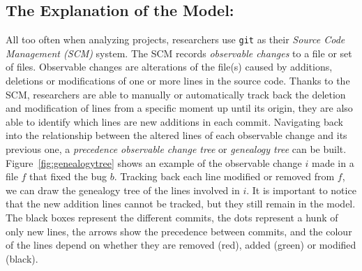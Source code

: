 \documentclass[a4paper, 12pt]{book}
\begin{document}

\subsection{The Explanation of the Model:}
All too often when analyzing projects, researchers use \texttt{git} as their \textit{Source Code Management (SCM)} system. The SCM records \emph{observable changes} to a file or set of files. Observable changes are alterations of the file(s) caused by additions, deletions or modifications of one or more lines in the source code. Thanks to the SCM, researchers are able to manually or automatically track back the deletion and modification of lines from a specific moment up until its origin, they are also able to identify which lines are new additions in each commit. Navigating back into the relationship between the altered lines of each observable change and its previous one, a \emph{precedence observable change tree} or \emph{genealogy tree} can be built. Figure~\ref{fig:genealogytree} shows an example of the observable change $i$ made in a file $f$ that fixed the bug $b$. Tracking back each line modified or removed from $f$, we can draw the genealogy tree of the lines involved in $i$. It is important to notice that the new addition lines cannot be tracked, but they still remain in the model. The black boxes represent the different commits, the dots represent a hunk of only new lines, the arrows show the precedence between commits, and the colour of the lines depend on whether they are removed (red), added (green) or modified (black). 
\end{document}
